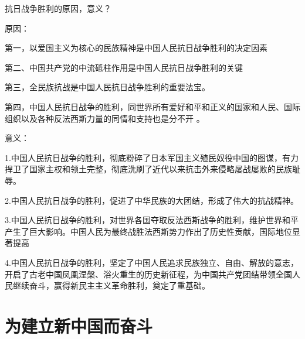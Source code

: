 \documentclass[lang=cn,10pt]{elegantbook}
\begin{document}
	\begin{example}
		抗日战争胜利的原因，意义？
	\end{example}
	\begin{solution}
		
		原因：
		
		第一，以爱国主义为核心的民族精神是中国人民抗日战争胜利的决定因素
		
		第二、中国共产党的中流砥柱作用是中国人民抗日战争胜利的关键
		
		第三，全民族抗战是中国人民抗日战争胜利的重要法宝。
		
		第四，中国人民抗日战争的胜利，同世界所有爱好和平和正义的国家和人民、国际组织以及各种反法西斯力量的同情和支持也是分不开 。
		
		意义：
		
		1.中国人民抗日战争的胜利，彻底粉碎了日本军国主义殖民奴役中国的图谋，有力捍卫了国家主权和领土完整，彻底洗刷了近代以来抗击外来侵略屡战屡败的民族耻辱。
		
		2.中国人民抗日战争的胜利，促进了中华民族的大团结，形成了伟大的抗战精神。 
		
		3.中国人民抗日战争的胜利，对世界各国夺取反法西斯战争的胜利，维护世界和平产生了巨大影响。中国人民为最终战胜法西斯势力作出了历史性贡献，国际地位显著提高
		
		4.中国人民抗日战争的胜利，坚定了中国人民追求民族独立、自由、解放的意志，开启了古老中国凤凰涅槃、浴火重生的历史新征程，为中国共产党团结带领全国人民继续奋斗，赢得新民主主义革命胜利，奠定了重基础。
	\end{solution}
	\chapter{为建立新中国而奋斗}
	
\end{document}
